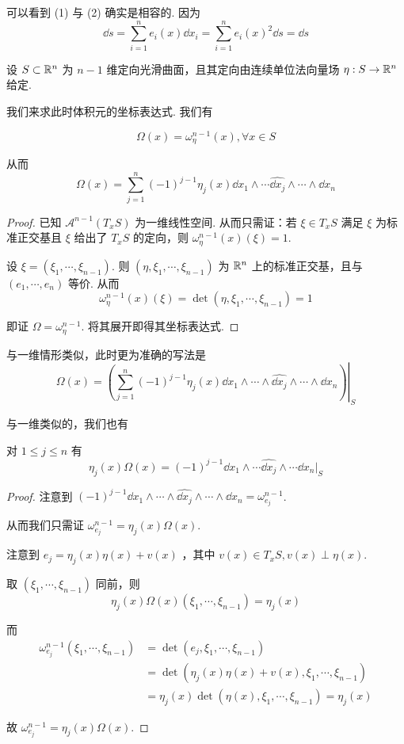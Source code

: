可以看到 (1) 与 (2) 确实是相容的. 因为
$$
\dd s=\sum_{i=1}^ne_i(x)\dd x_i=\sum_{i=1}^ne_i(x)^2\dd s=\dd s
$$


设 $S\subset\mathbb{R}^n$ 为 $n-1$ 维定向光滑曲面，且其定向由连续单位法向量场 $\eta:S\to\mathbb{R}^n$ 给定.

我们来求此时体积元的坐标表达式. 我们有

\begin{property}
$$
\Omega(x)=\omega_\eta^{n-1}(x),\forall x\in S
$$

    从而
$$
\Omega(x)=\sum_{j=1}^n(-1)^{j-1}\eta_j(x)\dd x_1\wedge\cdots\widehat{\dd x_j}\wedge\cdots\wedge\dd x_n
$$
\end{property}
\begin{proof}
    已知 $\mathscr{A}^{n-1}(T_xS)$ 为一维线性空间. 从而只需证：若 $\xi\in T_xS$ 满足 $\xi$ 为标准正交基且 $\xi$ 给出了 $T_xS$ 的定向，则 $\omega_\eta^{n-1}(x)(\xi)=1$.

    设 $\xi=(\xi_1,\cdots,\xi_{n-1})$. 则 $(\eta,\xi_1,\cdots,\xi_{n-1})$ 为 $\mathbb{R}^n$ 上的标准正交基，且与 $(e_1,\cdots,e_n)$ 等价. 从而
$$
\omega_\eta^{n-1}(x)(\xi)=\det(\eta,\xi_1,\cdots,\xi_{n-1})=1
$$

    即证 $\Omega=\omega_\eta^{n-1}$. 将其展开即得其坐标表达式.
\end{proof}

\begin{hint}
    与一维情形类似，此时更为准确的写法是
$$
\Omega(x)=\left.\left(\sum_{j=1}^n(-1)^{j-1}\eta_j(x)\dd x_1\wedge\cdots\wedge\widehat{\dd x_j}\wedge\cdots\wedge\dd x_n\right)\right|_S
$$
\end{hint}

与一维类似的，我们也有

\begin{inference}
    对 $1\le j\le n$ 有
$$
\eta_j(x)\Omega(x)=(-1)^{j-1}\dd x_1\wedge\cdots\widehat{\dd x_j}\wedge\cdots\dd x_n|_S
$$
\end{inference}
\begin{proof}
    注意到 $(-1)^{j-1}\dd x_1\wedge\cdots\wedge\widehat{\dd x_j}\wedge\cdots\wedge\dd x_n=\omega_{e_j}^{n-1}$.

    从而我们只需证 $\omega_{e_j}^{n-1}=\eta_j(x)\Omega(x)$.

    注意到 $e_j=\eta_j(x)\eta(x)+v(x)$ ，其中 $v(x)\in T_xS,v(x)\perp\eta(x)$.

    取 $(\xi_1,\cdots,\xi_{n-1})$ 同前，则
$$
\eta_j(x)\Omega(x)(\xi_1,\cdots,\xi_{n-1})=\eta_j(x)
$$

    而
$$
\begin{aligned}
\omega_{e_j}^{n-1}(\xi_1,\cdots,\xi_{n-1})&=\det(e_j,\xi_1,\cdots,\xi_{n-1})\\
&=\det(\eta_j(x)\eta(x)+v(x),\xi_1,\cdots,\xi_{n-1})\\
&=\eta_j(x)\det(\eta(x),\xi_1,\cdots,\xi_{n-1})=\eta_j(x)
\end{aligned}
$$

    故 $\omega_{e_j}^{n-1}=\eta_j(x)\Omega(x)$.
\end{proof}

